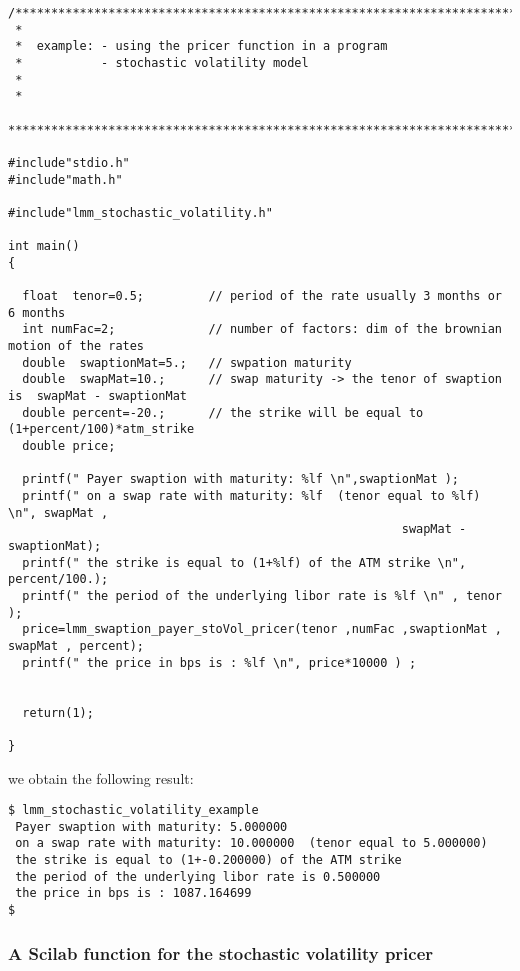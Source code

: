 \small{

\begin{verbatim}
/*************************************************************************
 *
 *  example: - using the pricer function in a program
 *           - stochastic volatility model
 *
 *
 *************************************************************************/

#include"stdio.h"
#include"math.h"

#include"lmm_stochastic_volatility.h"

int main()
{

  float  tenor=0.5;         // period of the rate usually 3 months or 6 months
  int numFac=2;             // number of factors: dim of the brownian motion of the rates   
  double  swaptionMat=5.;   // swpation maturity
  double  swapMat=10.;      // swap maturity -> the tenor of swaption is  swapMat - swaptionMat
  double percent=-20.;      // the strike will be equal to (1+percent/100)*atm_strike
  double price;

  printf(" Payer swaption with maturity: %lf \n",swaptionMat );
  printf(" on a swap rate with maturity: %lf  (tenor equal to %lf)  \n", swapMat , 
	                                                   swapMat - swaptionMat);
  printf(" the strike is equal to (1+%lf) of the ATM strike \n", percent/100.); 
  printf(" the period of the underlying libor rate is %lf \n" , tenor );
  price=lmm_swaption_payer_stoVol_pricer(tenor ,numFac ,swaptionMat , swapMat , percent);
  printf(" the price in bps is : %lf \n", price*10000 ) ;

  
  return(1);

} 

\end{verbatim}

}


we obtain the following result:

\small{

\begin{verbatim}
$ lmm_stochastic_volatility_example 
 Payer swaption with maturity: 5.000000 
 on a swap rate with maturity: 10.000000  (tenor equal to 5.000000)  
 the strike is equal to (1+-0.200000) of the ATM strike 
 the period of the underlying libor rate is 0.500000 
 the price in bps is : 1087.164699 
$ 
\end{verbatim} 
}



\subsubsection{A Scilab function for the stochastic volatility pricer}


